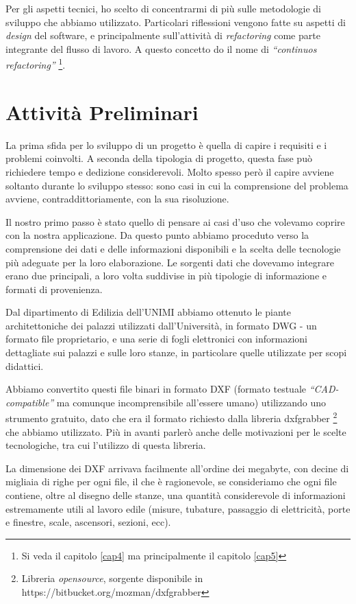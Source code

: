 \documentclass[12pt]{report}
\begin{document}
Per gli aspetti tecnici, ho scelto di concentrarmi di più sulle
metodologie di sviluppo che abbiamo utilizzato. 
Particolari riflessioni vengono fatte su
aspetti di \textit{design} del software, e principalmente sull'attività
di \textit{refactoring} come parte integrante del flusso di lavoro.
A questo concetto do il nome di \textit{“continuos refactoring”} 
\footnote{Si veda il capitolo \ref{cap4} ma principalmente il capitolo \ref{cap5}}.


% 
% 
\chapter{Attività Preliminari}
\label{cap2}

La prima sfida per lo sviluppo di un progetto è quella di capire i
requisiti e i problemi coinvolti. A seconda della tipologia di
progetto, questa fase può richiedere tempo e dedizione considerevoli. Molto
spesso però il capire avviene soltanto durante lo sviluppo stesso:
sono casi in cui la comprensione del problema avviene, contraddittoriamente,
con la sua risoluzione.

Il nostro primo passo è stato quello di pensare ai casi d'uso che
volevamo coprire con la nostra applicazione. Da questo punto abbiamo
proceduto verso la comprensione dei dati e delle informazioni
disponibili e la scelta delle tecnologie più adeguate per la loro
elaborazione. Le sorgenti dati che dovevamo integrare erano due
principali, a loro volta suddivise in più tipologie di informazione e
formati di provenienza.

Dal dipartimento di Edilizia dell'UNIMI abbiamo ottenuto le piante
architettoniche dei palazzi utilizzati dall'Università, in formato DWG
- un formato file proprietario, e una serie di fogli elettronici con
informazioni dettagliate sui palazzi e sulle loro stanze, in particolare
quelle utilizzate per scopi didattici.

Abbiamo convertito questi file binari in formato DXF (formato testuale
\textit{``CAD-compatible''} ma comunque incomprensibile all'essere
umano) utilizzando uno strumento gratuito, dato che era il formato
richiesto dalla libreria dxfgrabber \footnote{Libreria \textit{opensource},
sorgente disponibile in https://bitbucket.org/mozman/dxfgrabber} che abbiamo
utilizzato. Più in avanti parlerò anche delle motivazioni per le scelte
tecnologiche, tra cui l'utilizzo di questa libreria.

La dimensione dei DXF arrivava facilmente all'ordine dei
megabyte, con decine di migliaia di righe per ogni file, il che è ragionevole, se
consideriamo che ogni file contiene, oltre al disegno delle stanze, una 
quantità considerevole di informazioni estremamente utili al lavoro edile
(misure, tubature, passaggio di elettricità, porte e finestre, scale, 
ascensori, sezioni, ecc).
\end{document}
